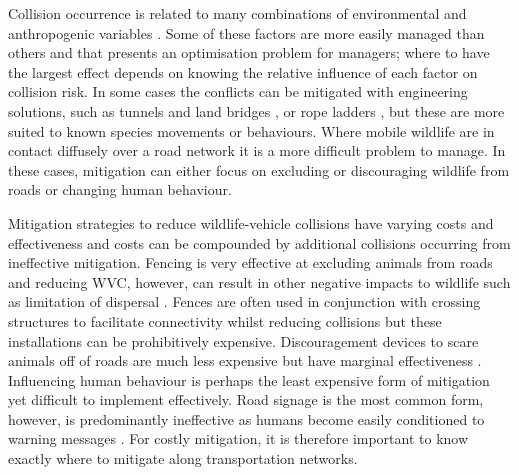 
Collision occurrence is related to many combinations of environmental and anthropogenic variables \citep{barn07}. Some of these factors are more easily managed than others and that presents an optimisation problem for managers; where to have the largest effect depends on knowing the relative influence of each factor on collision risk. In some cases the conflicts can be mitigated with engineering solutions, such as tunnels and land bridges \citep{bond08}, or rope ladders \citep{soan13}, but these are more suited to known species movements or behaviours. Where mobile wildlife are in contact diffusely over a road network it is a more difficult problem to manage. In these cases, mitigation can either focus on excluding or discouraging wildlife from roads or changing human behaviour.

Mitigation strategies to reduce wildlife-vehicle collisions have varying costs and effectiveness \citep{huij09} and costs can be compounded by additional collisions occurring from ineffective mitigation. Fencing is very effective at excluding animals from roads and reducing WVC, however, can result in other negative impacts to wildlife such as limitation of dispersal \citep[i.e. barrier effects, see][]{jaeg04}. Fences are often used in conjunction with crossing structures to facilitate connectivity whilst reducing collisions but these installations can be prohibitively expensive. Discouragement devices to scare animals off of roads are much less expensive but have marginal effectiveness \citep{bend03,sche03}. Influencing human behaviour is perhaps the least expensive form of mitigation yet difficult to implement effectively. Road signage is the most common form, however, is predominantly ineffective as humans become easily conditioned to warning messages \citep{bond13}. For costly mitigation, it is therefore important to know exactly where to mitigate along transportation networks.

